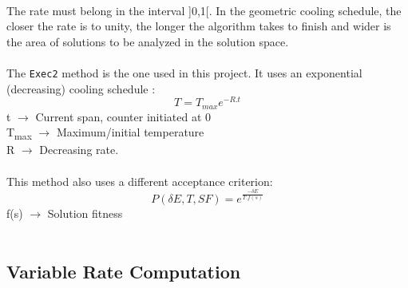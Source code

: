 \\
The rate must belong in the interval ]0,1[. In the geometric cooling schedule, the closer the rate is to unity, the longer the algorithm takes to finish and wider is the area of solutions to be analyzed in the solution space.\\
\\
The \verb+Exec2+ method is the one used in this project. It uses an exponential (decreasing) cooling schedule \cite{CarvalhoLisbonNovember2004}:\\
\[T = T_{max}e^{-R.t} \]
t $\rightarrow$ Current span, counter initiated at 0\\
T\textsubscript{max} $\rightarrow$ Maximum/initial temperature\\
R $\rightarrow$ Decreasing rate.\\
\\
This method also uses a different acceptance criterion:\\
\[P(\delta E, T, SF) = e^{\frac{-\delta E}{T.f(s)}} \]
f(s) $\rightarrow$ Solution fitness\\
\\
\subsection{Variable Rate Computation}

